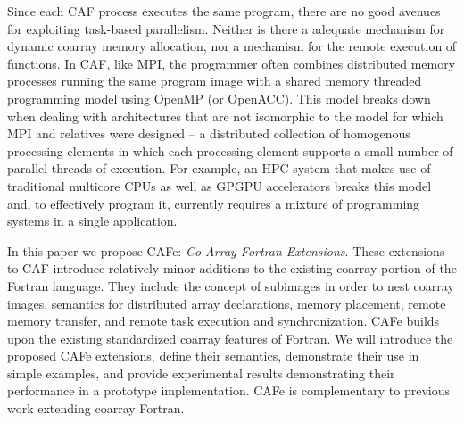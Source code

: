 Since each CAF process executes the same program, there are no good avenues for exploiting
task-based parallelism.  Neither is there a adequate mechanism for dynamic coarray memory
allocation, nor a mechanism for the remote execution of functions.  In CAF, like MPI, the
programmer often combines distributed memory processes running the same program image with a
shared memory threaded programming model using OpenMP (or OpenACC).  This model breaks down
when dealing with architectures that are not isomorphic to the model for which MPI and
relatives were designed -- a distributed collection of homogenous processing elements in
which each processing element supports a small number of parallel threads of execution.  For
example, an HPC system that makes use of traditional multicore CPUs as well as GPGPU accelerators
breaks this model and, to effectively program it, currently requires a mixture of programming
systems in a single application.

In this paper we propose CAFe: \emph{Co-Array Fortran Extensions}.  These extensions to CAF introduce
relatively minor additions to the existing coarray portion of the Fortran language.  They
include the concept of subimages in order to nest coarray images, semantics for distributed
array declarations, memory placement, remote memory transfer, and remote task execution
and synchronization.  CAFe
builds upon the existing standardized coarray features of Fortran.  We will introduce the
proposed CAFe extensions, define their semantics, demonstrate their use in simple
examples, and provide experimental results demonstrating their performance in a prototype implementation.
CAFe is complementary to
previous work extending coarray Fortran\cite{mellor-crummey:2009:caf2,jin:2011:caf2}.



